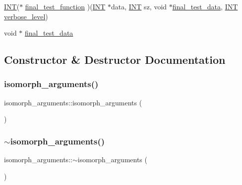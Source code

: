 \begin{DoxyCompactItemize}
\item 
\mbox{\hyperlink{galois_8h_a09fddde158a3a20bd2dcadb609de11dc}{I\+NT}}($\ast$ \mbox{\hyperlink{classisomorph__arguments_a4911ad11d972987f87cf65464e6c6f1d}{final\+\_\+test\+\_\+function}} )(\mbox{\hyperlink{galois_8h_a09fddde158a3a20bd2dcadb609de11dc}{I\+NT}} $\ast$data, \mbox{\hyperlink{galois_8h_a09fddde158a3a20bd2dcadb609de11dc}{I\+NT}} sz, void $\ast$\mbox{\hyperlink{classisomorph__arguments_a2c4c1f9159141167a769c9df0fcb1ff1}{final\+\_\+test\+\_\+data}}, \mbox{\hyperlink{galois_8h_a09fddde158a3a20bd2dcadb609de11dc}{I\+NT}} \mbox{\hyperlink{simeon_8_c_a818073fbcc2f439e7c56952f67386122}{verbose\+\_\+level}})
\item 
void $\ast$ \mbox{\hyperlink{classisomorph__arguments_a2c4c1f9159141167a769c9df0fcb1ff1}{final\+\_\+test\+\_\+data}}
\end{DoxyCompactItemize}


\subsection{Constructor \& Destructor Documentation}
\mbox{\label{classisomorph__arguments_a10286ca1b855d2b870afb88eaf5b7d6a}} 
\subsubsection{\texorpdfstring{isomorph\+\_\+arguments()}{isomorph\_arguments()}}
{\footnotesize\ttfamily isomorph\+\_\+arguments\+::isomorph\+\_\+arguments (\begin{DoxyParamCaption}{ }\end{DoxyParamCaption})}

\mbox{\label{classisomorph__arguments_ae46637de6ebb25db1ce92bc16d95bf88}} 
\subsubsection{\texorpdfstring{$\sim$isomorph\+\_\+arguments()}{~isomorph\_arguments()}}
{\footnotesize\ttfamily isomorph\+\_\+arguments\+::$\sim$isomorph\+\_\+arguments (\begin{DoxyParamCaption}{ }\end{DoxyParamCaption})}



